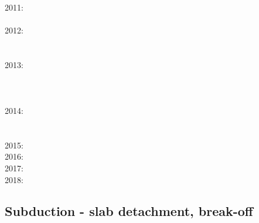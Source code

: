       \cite{moyb10}\cite{zhst10}\\
2011: \cite{lixg11}\cite{list11}\cite{bubj11}\cite{bagw11b}\cite{cafz11}\cite{geme11}\cite{qube11}\\
      \cite{blgg11}\\
2012: \cite{anwb12}\cite{jahu12}\cite{jabi12}\cite{jabk12}\cite{lixg12}\cite{grpy12}\cite{grpy12b}\\
      \cite{ronb12}\cite{tebu12}\cite{thka12}\cite{bova12}\cite{civs12}\cite{camo12}\cite{cafa12} \\
      \cite{gebk12}\cite{liri12}\cite{beva12}\cite{uegb12}\\
2013: \cite{nabg13}\cite{hage13}\cite{ancv13}\cite{namu13}\cite{yosh13}\cite{zhgt13}\cite{lixg13} \\
      \cite{jabr13}\cite{izht13}\cite{luws13}\cite{dusc13}\cite{tibb13}\cite{bubj13}\cite{scmo13} \\
      \cite{fuob13}\cite{magc13}\cite{musi13}\cite{mibg13}\cite{grpy13}\cite{vagd13a}\cite{vagd13b}\\
      \cite{cavg13}\cite{vocg13}\\
2014: \cite{robn14}\cite{hond14}\cite{ronc14}\cite{mobm14}\cite{famc14}\cite{fogm14}\cite{frba14} \\
      \cite{gagd14}\cite{voge14}\cite{voge14b}\cite{lidr14}\cite{bocj04}\cite{bagb14}\cite{stjm14}\\
      \cite{basc14}\cite{vamd14}\\
2015: \cite{bemm15}\cite{bomv15}\cite{bogf15}\cite{ceag15}\cite{kifr15}\cite{vami15}\\
2016: \cite{tomy16}\cite{gukt16}\cite{robn16}\\
2017: \cite{kicf17}\cite{sche17}\\
2018: \cite{yamz18}

\subsection*{Subduction - slab detachment, break-off}
 

